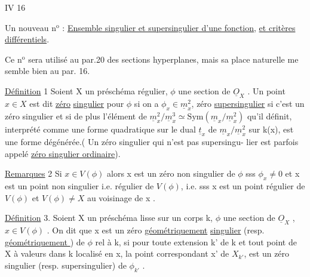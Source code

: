 
IV 16

Un nouveau n$^{\text{o}}$ : \uline{Ensemble singulier et supersingulier d'une fonction},
\uline{et critères différentiels}.

Ce n$^{\text{o}}$ sera utilisé au par.20 des sections hyperplanes, mais sa
place naturelle me semble bien au par. 16.

\uline{Définition} 1 Soient X un préschéma régulier, $\phi$ une section de $\underline{O}_X$ . Un
point $x \in X$ est dit \uline{zéro}  \uline{singulier} pour $\phi$
si on a $\phi_x \in \underline{m}_x^2$, zéro \uline{supersingulier} si c'est un zéro singulier
et si de plus l'élément de $\underline{m}_x^2/\underline{m}_x^3 \simeq \mathrm{Sym}(\underline{m}_x/\underline{m}_x^2)$ qu'il définit,
interprété comme une forme quadratique sur le dual $\underline{t}_x$ de $\underline{m}_x/\underline{m}_x^2$ sur k(x),
est une forme  dégénérée.( Un zéro singulier qui n'est pas supersingu-%
lier est parfois appelé \uline{zéro singulier ordinaire}).

\uline{Remarques} 2 Si $x \in V(\phi)$\hand{,} alors x est un zéro non singulier de $\phi$ sss
$\phi_x \neq 0$ et x est un point  non singulier i.e. régulier de $V(\phi)$,
i.e. sss x est un point régulier de $V(\phi)$ et $V(\phi) \neq X$ au voisinage de
x . 

\uline{Définition} 3. Soient X un préschéma lisse sur un corps k, $\phi$ une
section de $\underline{O}_X$ , $x \in V(\phi)$ . On dit que x est un zéro \uline{géométriquement}
\uline{singulier}  (resp. \uline{géométriquement } ) de $\phi$ rel à k,
si pour toute extension k' de k et tout point \hand{$\xi$} de X à valeurs dans
k\hand{,} localisé en x, la  point correspondant x' de $X_{k'}$, est un zéro
 singulier (resp. supersingulier) de $\phi_{k'}$ .

